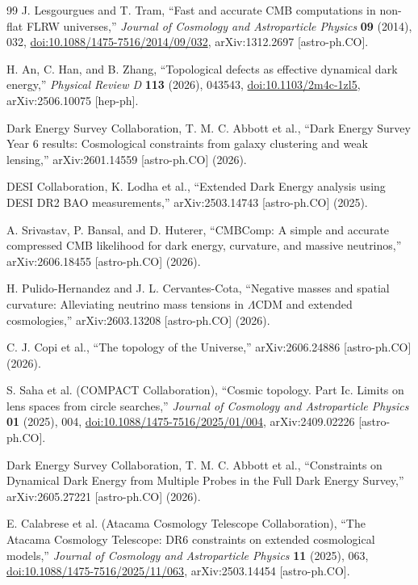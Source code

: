 \documentclass[11pt,a4paper]{article}
\numberwithin{equation}{section}
\theoremstyle{definition}
\theoremstyle{plain}
\theoremstyle{remark}
\begin{document}
\begin{thebibliography}{99}
J. Lesgourgues and T. Tram, ``Fast and accurate CMB computations in non-flat FLRW universes,'' \emph{Journal of Cosmology and Astroparticle Physics} \textbf{09} (2014), 032, \href{https://doi.org/10.1088/1475-7516/2014/09/032}{doi:10.1088/1475-7516/2014/09/032}, arXiv:1312.2697 [astro-ph.CO].

H. An, C. Han, and B. Zhang, ``Topological defects as effective dynamical dark energy,'' \emph{Physical Review D} \textbf{113} (2026), 043543, \href{https://doi.org/10.1103/2m4c-1zl5}{doi:10.1103/2m4c-1zl5}, arXiv:2506.10075 [hep-ph].

Dark Energy Survey Collaboration, T. M. C. Abbott et al., ``Dark Energy Survey Year 6 results: Cosmological constraints from galaxy clustering and weak lensing,'' arXiv:2601.14559 [astro-ph.CO] (2026).

DESI Collaboration, K. Lodha et al., ``Extended Dark Energy analysis using DESI DR2 BAO measurements,'' arXiv:2503.14743 [astro-ph.CO] (2025).

A. Srivastav, P. Bansal, and D. Huterer, ``CMBComp: A simple and accurate compressed CMB likelihood for dark energy, curvature, and massive neutrinos,'' arXiv:2606.18455 [astro-ph.CO] (2026).

H. Pulido-Hernandez and J. L. Cervantes-Cota, ``Negative masses and spatial curvature: Alleviating neutrino mass tensions in \(\Lambda\)CDM and extended cosmologies,'' arXiv:2603.13208 [astro-ph.CO] (2026).

C. J. Copi et al., ``The topology of the Universe,'' arXiv:2606.24886 [astro-ph.CO] (2026).

S. Saha et al. (COMPACT Collaboration), ``Cosmic topology. Part Ic. Limits on lens spaces from circle searches,'' \emph{Journal of Cosmology and Astroparticle Physics} \textbf{01} (2025), 004, \href{https://doi.org/10.1088/1475-7516/2025/01/004}{doi:10.1088/1475-7516/2025/01/004}, arXiv:2409.02226 [astro-ph.CO].

Dark Energy Survey Collaboration, T. M. C. Abbott et al., ``Constraints on Dynamical Dark Energy from Multiple Probes in the Full Dark Energy Survey,'' arXiv:2605.27221 [astro-ph.CO] (2026).

E. Calabrese et al. (Atacama Cosmology Telescope Collaboration), ``The Atacama Cosmology Telescope: DR6 constraints on extended cosmological models,'' \emph{Journal of Cosmology and Astroparticle Physics} \textbf{11} (2025), 063, \href{https://doi.org/10.1088/1475-7516/2025/11/063}{doi:10.1088/1475-7516/2025/11/063}, arXiv:2503.14454 [astro-ph.CO].


\end{thebibliography}
\end{document}
